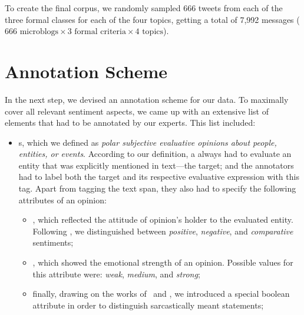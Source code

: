 To create the final corpus, we randomly sampled 666 tweets from each
of the three formal classes for each of the four topics, getting a
total of 7,992 messages ($666\text{ microblogs} \times 3\text{ formal
  criteria} \times 4\text{ topics}$).

\section{Annotation Scheme}\label{subsec:snt:ascheme}

In the next step, we devised an annotation scheme for our data.  To
maximally cover all relevant sentiment aspects, we came up with an
extensive list of elements that had to be annotated by our experts.
This list included:

\begin{itemize}
\item
  \textbf{}s, which we defined as \emph{polar
    subjective evaluative opinions about people, entities, or events}.
  According to our definition, a  always had to
  evaluate an entity that was explicitly mentioned in text---the
  target; and the annotators had to label both the target and its
  respective evaluative expression with this tag. Apart from tagging
  the text span, they also had to specify the following attributes of
  an opinion:
  \begin{itemize}
  \item{}, which reflected the attitude of opinion's
    holder to the evaluated entity.  Following
    \citet{Jindal:06a,Jindal:06b}, we distinguished between
    \emph{positive}, \emph{negative}, and \emph{comparative}
    sentiments;
  \item{}, which showed the emotional strength of
    an opinion.  Possible values for this attribute were: \emph{weak},
    \emph{medium}, and \emph{strong};
  \item finally, drawing on the works of~\citet{Bosco:13} and
    \citet{Rosenthal:14}, we introduced a special boolean attribute
     in order to distinguish sarcastically meant
    statements;
  \end{itemize}



\end{itemize}
